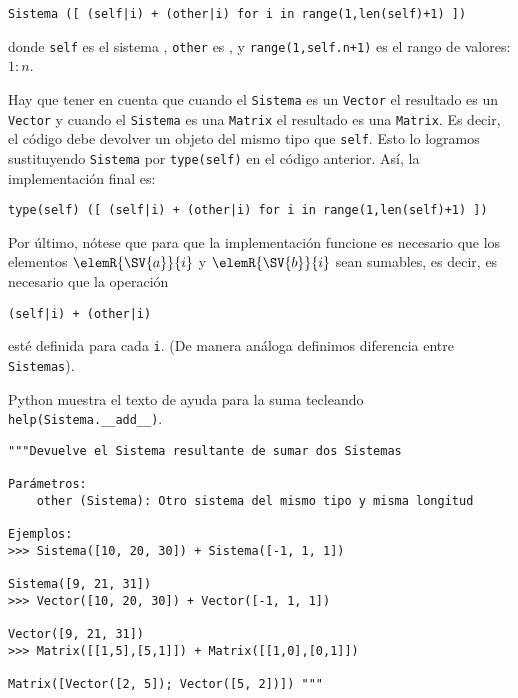 \documentclass[11pt]{report}
\begin{document}
\begin{verbatim}
Sistema ([ (self|i) + (other|i) for i in range(1,len(self)+1) ])
\end{verbatim}
donde \texttt{self} es el sistema , \texttt{other} es , y
\texttt{range(1,self.n+1)} es el rango de valores: \(1:n\).

Hay que tener en cuenta que cuando el \texttt{Sistema} es un \texttt{Vector} el
resultado es un \texttt{Vector} y cuando el \texttt{Sistema} es una \texttt{Matrix} el
resultado es una \texttt{Matrix}. Es decir, el código debe devolver un objeto
del mismo tipo que \texttt{self}. Esto lo logramos sustituyendo \texttt{Sistema} por
\texttt{type(self)} en el código anterior. Así, la implementación final es:

\begin{verbatim}
type(self) ([ (self|i) + (other|i) for i in range(1,len(self)+1) ])
\end{verbatim}
Por último, nótese que para que la implementación funcione es
necesario que los elementos \(\elemR{\SV{a}}{i}\) y \(\elemR{\SV{b}}{i}\)
sean sumables, es decir, es necesario que la operación

\begin{verbatim}
(self|i) + (other|i)
\end{verbatim}
esté definida para cada \texttt{i}. (De manera análoga definimos diferencia
entre \texttt{Sistemas}).

Python muestra el texto de ayuda para la suma tecleando \texttt{help(Sistema.\_\_add\_\_)}.
\begin{verbatim}
"""Devuelve el Sistema resultante de sumar dos Sistemas

Parámetros: 
    other (Sistema): Otro sistema del mismo tipo y misma longitud

Ejemplos:
>>> Sistema([10, 20, 30]) + Sistema([-1, 1, 1])

Sistema([9, 21, 31]) 
>>> Vector([10, 20, 30]) + Vector([-1, 1, 1])

Vector([9, 21, 31]) 
>>> Matrix([[1,5],[5,1]]) + Matrix([[1,0],[0,1]]) 

Matrix([Vector([2, 5]); Vector([5, 2])]) """
\end{verbatim}
\end{document}
